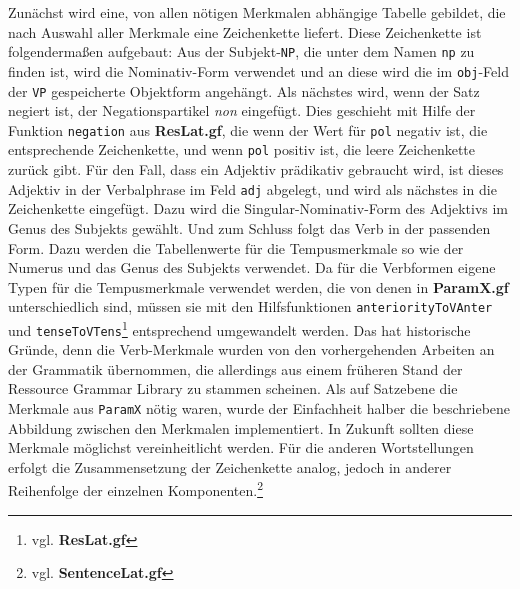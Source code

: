 Zunächst wird eine, von allen nötigen Merkmalen abhängige Tabelle gebildet, die nach Auswahl aller Merkmale eine Zeichenkette liefert. Diese Zeichenkette ist folgendermaßen aufgebaut: Aus der Subjekt-\texttt{NP}, die unter dem Namen \texttt{np} zu finden ist, wird die Nominativ-Form verwendet und an diese wird die im \texttt{obj}-Feld der \texttt{VP} gespeicherte Objektform angehängt. Als nächstes wird, wenn der Satz negiert ist, der Negationspartikel \textit{non} eingefügt. Dies geschieht mit Hilfe der Funktion \texttt{negation} aus \textbf{ResLat.gf}, die wenn der Wert für \texttt{pol} negativ ist, die entsprechende Zeichenkette, und wenn \texttt{pol} positiv ist, die leere Zeichenkette zurück gibt. Für den Fall, dass ein Adjektiv prädikativ gebraucht wird, ist dieses Adjektiv in der Verbalphrase im Feld \texttt{adj} abgelegt, und wird als nächstes in die Zeichenkette eingefügt. Dazu wird die Singular-Nominativ-Form des Adjektivs im Genus des Subjekts gewählt. Und zum Schluss folgt das Verb in der passenden Form. Dazu werden die Tabellenwerte für die Tempusmerkmale so wie der Numerus und das Genus des Subjekts verwendet. Da für die Verbformen eigene Typen für die Tempusmerkmale verwendet werden, die von denen in \textbf{ParamX.gf} unterschiedlich sind, müssen sie mit den Hilfsfunktionen \texttt{anteriorityToVAnter} und \texttt{tenseToVTens}\footnote{vgl. \textbf{ResLat.gf}} entsprechend umgewandelt werden. Das hat historische Gründe, denn die Verb-Merkmale wurden von den vorhergehenden Arbeiten an der Grammatik übernommen, die allerdings aus einem früheren Stand der Ressource Grammar Library zu stammen scheinen. Als auf Satzebene die Merkmale aus \texttt{ParamX} nötig waren, wurde der Einfachheit halber die beschriebene Abbildung zwischen den Merkmalen implementiert. In Zukunft sollten diese Merkmale möglichst vereinheitlicht werden. Für die anderen Wortstellungen erfolgt die Zusammensetzung der Zeichenkette analog, jedoch in anderer Reihenfolge der einzelnen Komponenten.\footnote{vgl. \textbf{SentenceLat.gf}} \par
